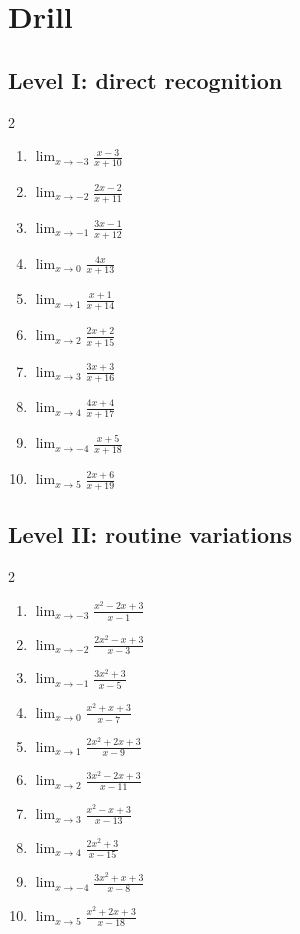 \documentclass[11pt,oneside]{book}
\begin{document}
\section*{Drill}
\subsection*{Level I: direct recognition}
\begin{multicols}{2}
\begin{enumerate}[leftmargin=*,label=\textbf{\arabic*.},itemsep=0.65\baselineskip]
\item $\displaystyle \lim_{x \to -3} \frac{x - 3}{x + 10}$
\item $\displaystyle \lim_{x \to -2} \frac{2 x - 2}{x + 11}$
\item $\displaystyle \lim_{x \to -1} \frac{3 x - 1}{x + 12}$
\item $\displaystyle \lim_{x \to 0} \frac{4 x}{x + 13}$
\item $\displaystyle \lim_{x \to 1} \frac{x + 1}{x + 14}$
\item $\displaystyle \lim_{x \to 2} \frac{2 x + 2}{x + 15}$
\item $\displaystyle \lim_{x \to 3} \frac{3 x + 3}{x + 16}$
\item $\displaystyle \lim_{x \to 4} \frac{4 x + 4}{x + 17}$
\item $\displaystyle \lim_{x \to -4} \frac{x + 5}{x + 18}$
\item $\displaystyle \lim_{x \to 5} \frac{2 x + 6}{x + 19}$
\end{enumerate}
\end{multicols}
\subsection*{Level II: routine variations}
\begin{multicols}{2}
\begin{enumerate}[leftmargin=*,label=\textbf{\arabic*.},itemsep=0.65\baselineskip]
\item $\displaystyle \lim_{x \to -3} \frac{x^{2} - 2 x + 3}{x - 1}$
\item $\displaystyle \lim_{x \to -2} \frac{2 x^{2} - x + 3}{x - 3}$
\item $\displaystyle \lim_{x \to -1} \frac{3 x^{2} + 3}{x - 5}$
\item $\displaystyle \lim_{x \to 0} \frac{x^{2} + x + 3}{x - 7}$
\item $\displaystyle \lim_{x \to 1} \frac{2 x^{2} + 2 x + 3}{x - 9}$
\item $\displaystyle \lim_{x \to 2} \frac{3 x^{2} - 2 x + 3}{x - 11}$
\item $\displaystyle \lim_{x \to 3} \frac{x^{2} - x + 3}{x - 13}$
\item $\displaystyle \lim_{x \to 4} \frac{2 x^{2} + 3}{x - 15}$
\item $\displaystyle \lim_{x \to -4} \frac{3 x^{2} + x + 3}{x - 8}$
\item $\displaystyle \lim_{x \to 5} \frac{x^{2} + 2 x + 3}{x - 18}$
\end{enumerate}
\end{multicols}
\end{document}
